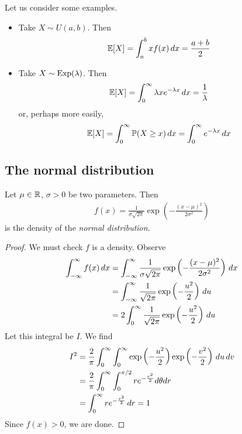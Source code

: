 \documentclass{../../template/note}
\begin{document}
    \begin{example*}
        Let us consider some examples.
        \begin{itemize}
            \item Take \(X \sim U(a, b)\). Then
            \begin{align*}
                \mathbb E[X] = \int_a^b xf(x) \,d{x} = \frac{a+b} 2
            \end{align*}
            \item Take \(X \sim \operatorname{Exp}(\lambda)\). Then
            \begin{align*}
                \mathbb E[X] = \int_0^\infty \lambda x e^{-\lambda x} \,d{x} = \frac 1 \lambda
            \end{align*}
            or, perhaps more easily,
            \begin{align*}
                \mathbb E[X] = \int_0^\infty \mathbb P(X \geq x) \,d{x} = \int_0^\infty e^{-\lambda x} \,d{x}
            \end{align*}
        \end{itemize}
    \end{example*}
    
    \subsection{The normal distribution}

    \begin{definition}
        Let \(\mu \in \mathbb R\), \(\sigma > 0\) be two parameters. Then
        \begin{align*}
            f(x) = \frac 1 {\sigma \sqrt{2\pi}} \exp\left(-\frac{(x-\mu)^2}{2\sigma^2}\right)
        \end{align*}
        is the density of the \emph{normal distribution}.       
    \end{definition}
    
    \begin{proof}
        We must check \(f\) is a density. Observe
        \begin{align*}
            \int_{-\infty}^\infty f(x) \,d{x} &= \int_{-\infty}^\infty \frac 1 {\sigma \sqrt{2\pi}} \exp\left(-\frac{(x-\mu)^2}{2\sigma^2}\right) \,d{x} \\
            &= \int_{-\infty}^\infty \frac 1 {\sqrt{2\pi}} \exp\left(-\frac {u^2}2\right) \,d{u} \\
            &= 2 \int_0^\infty \frac 1 {\sqrt{2\pi}} \exp\left(-\frac {u^2}2\right) \,d{u}
        \end{align*}
        Let this integral be \(I\). We find
        \begin{align*}
            I^2 &= \frac 2 \pi \int_0^\infty \int_0^\infty \exp\left(-\frac{u^2}2\right)\exp\left(-\frac{v^2}2\right) \,d{u} \,d{v} \\
            &= \frac 2 \pi \int_0^\infty \int_0^{\pi/2} re^{-\frac{r^2}2} d\theta dr \\
            &= \int_0^\infty r e^{-\frac{r^2}2} \,d{r} = 1
        \end{align*}
        Since \(f(x) > 0\), we are done.
    \end{proof}
    
\end{document}
